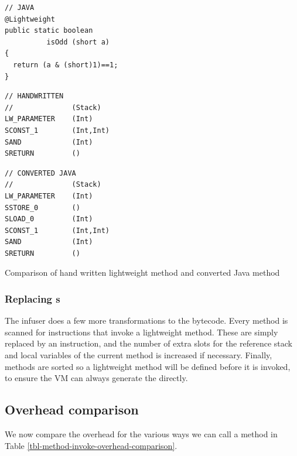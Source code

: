 \begin{listing}
 \centering
 \begin{minipage}[t]{0.32\textwidth}
  \centering
  \begin{verbatim}
// JAVA
@Lightweight
public static boolean
          isOdd (short a)
{
  return (a & (short)1)==1;
}
  \end{verbatim}
 \end{minipage}\hfill
 \begin{minipage}[t]{0.29\textwidth}
  \centering
  \begin{verbatim}
// HANDWRITTEN
//              (Stack)
LW_PARAMETER    (Int)
SCONST_1        (Int,Int)
SAND            (Int)
SRETURN         ()
  \end{verbatim}
 \end{minipage}\hfill
 \begin{minipage}[t]{0.29\textwidth}
  \centering
  \begin{verbatim}
// CONVERTED JAVA
//              (Stack)
LW_PARAMETER    (Int)
SSTORE_0        ()
SLOAD_0         (Int)
SCONST_1        (Int,Int)
SAND            (Int)
SRETURN         ()
  \end{verbatim}
 \end{minipage}
 \vspace{0.5cm}

\caption{Comparison of hand written lightweight method and converted Java method}
\label{lst-comparison-of-handwritten-and-converted-java-lw-method}
\end{listing}

\subsubsection{Replacing s}
The infuser does a few more transformations to the bytecode. Every method is scanned for  instructions that invoke a lightweight method. These are simply replaced by an  instruction, and the number of extra slots for the reference stack and local variables of the current method is increased if necessary. Finally, methods are sorted so a lightweight method will be defined before it is invoked, to ensure the VM can always generate the  directly.

\subsection{Overhead comparison}
We now compare the overhead for the various ways we can call a method in Table \ref{tbl-method-invoke-overhead-comparison}.

